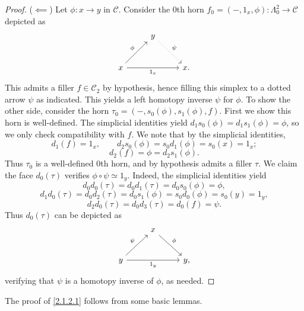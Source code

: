 \begin{proof}
	($\impliedby $) Let $\phi : x \to y$ in $\mathcal{C} $. Consider the 0th horn $f_0 =(-,1_x,\phi ) : \Lambda _0^2 \to \mathcal{C} $ depicted as
	\[\begin{tikzcd}[row sep = 2.5em, column sep = 2.5em]
	 & y \ar[" \psi  ", dotted, dr]  &  \\
	x \ar[" 1_x "', rr]\ar[" \phi  ", ur]  &  & x .
	\end{tikzcd}\]
	This admits a filler $f\in \mathcal{C} _2$ by hypothesis, hence filling this simplex to a dotted arrow $\psi $ as indicated. This yields a left homotopy inverse $\psi $ for $\phi $. To show the other side, consider the horn $\tau _0 = (-,s_0(\phi ),s_1(\phi ),f)$. First we show this horn is well-defined. The simplicial identities yield $d_1s_0(\phi )=d_1s_1(\phi )=\phi $, so we only check compatibility with $f$. We note that by the simplicial identities,
	\[
		d_1(f) = 1_x,\qquad d_2s_0(\phi ) = s_0d_1(\phi ) = s_0(x) = 1_x
	;\]
	\[
		d_2(f) = \phi = d_2s_1(\phi )
	.\]
	Thus $\tau _0$ is a well-defined 0th horn, and by hypothesis admits a filler $\tau $. We claim the face $d_0(\tau )$ verifies $\phi \circ \psi \simeq 1_y$. Indeed, the simplicial identities yield
	\[
		d_0d_0(\tau ) = d_0d_1(\tau ) = d_0s_0(\phi ) = \phi ,
	\]
	\[
		d_1d_0(\tau ) = d_0d_2(\tau ) = d_0s_1(\phi ) = s_0d_0(\phi ) = s_0(y)=1_y,
	\]
	\[
		d_2d_0(\tau ) = d_0d_3(\tau ) = d_0(f) = \psi 
	.\]
	Thus $d_0(\tau )$ can be depicted as 
	\[\begin{tikzcd}[row sep = 2.5em, column sep = 2.5em]
	 & x \ar[" \phi  ", dr]  &  \\
	y \ar[" \psi  ", ur] \ar[" 1_y "', rr]  &  & y,
	\end{tikzcd}\]
	verifying that $\psi $ is a homotopy inverse of $\phi $, as needed.
\end{proof}

The proof of \cref{2.1.2.1} follows from some basic lemmas.

